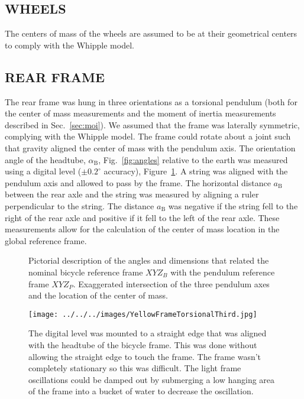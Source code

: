\documentclass{bmd2010p}
\begin{document}
\subsection{WHEELS}
The centers of mass of the wheels are assumed to be at their geometrical
centers to comply with the Whipple model.
\subsection{REAR FRAME}
The rear frame was hung in three orientations as a torsional pendulum (both for
the center of mass measurements and the moment of inertia measurements
described in Sec.~\ref{sec:moi}). We assumed that the frame was laterally
symmetric, complying with the Whipple model. The frame could rotate about a joint
such that gravity aligned the center of mass with the pendulum axis. The
orientation angle of the headtube, $\alpha_\mathrm{B}$, Fig.~\ref{fig:angles} relative
to the earth was measured using a digital level ($\pm0.2^{\circ}$ accuracy),
Figure~\ref{fig:level}. A string was aligned with the pendulum axis
and allowed to pass by the frame. The horizontal distance $a_\mathrm{B}$ between the rear
axle and the string was measured by aligning a ruler perpendicular to
the string. The distance $a_\mathrm{B}$ was negative if the string fell to the right of
the rear axle and positive if it fell to the left of the rear axle. These
measurements allow for the calculation of the center of mass location in the
global reference frame.
\begin{figure}[tbp]
    \centering
    \caption{ Pictorial description of the angles and dimensions that related
    the nominal bicycle reference frame $XYZ_B$ with the pendulum reference frame
    $XYZ_P$.  Exaggerated intersection of the three pendulum axes and the
    location of the center of mass.}
\end{figure}
\begin{figure}[tbp]
	\begin{center}
		\texttt{[image: ../../../images/YellowFrameTorsionalThird.jpg]}
	\end{center}
	\caption{The digital level was mounted to a straight edge that was aligned
    with the headtube of the bicycle frame. This was done without allowing the
    straight edge to touch the frame. The frame wasn't completely stationary so
    this was difficult. The light frame oscillations could be damped out by
    submerging a low hanging area of the frame into a bucket of water to
    decrease the oscillation.}
	\label{fig:level}
\end{figure}
\end{document}
